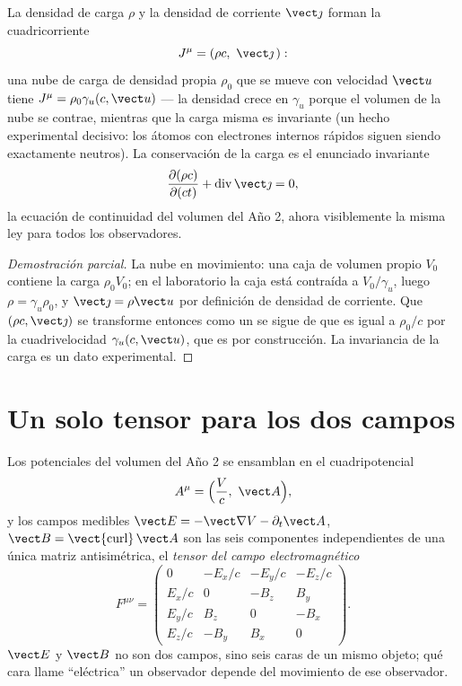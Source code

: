 \begin{proposition}\label{prop:b3:covariant-electromagnetism:fourcurrent}
La densidad de carga $\rho$ y la densidad de corriente $\vect\jmath$ forman
la cuadricorriente
\[
J^\mu = (\rho c,\ \vect\jmath\,) :
\]
una nube de carga de densidad propia $\rho_0$ que se mueve con velocidad
$\vect u$ tiene $J^\mu = \rho_0\gamma_u(c, \vect u)$ --- la densidad crece
en $\gamma_u$ porque el volumen de la nube se contrae, mientras que la carga
misma es invariante (un hecho experimental decisivo: los átomos con
electrones internos rápidos siguen siendo exactamente neutros). La
conservación de la carga es el enunciado invariante
\[
\frac{\partial(\rho c)}{\partial(ct)} +
\operatorname{div}\vect\jmath = 0 ,
\]
la ecuación de continuidad del volumen del Año 2, ahora visiblemente la
misma ley para todos los observadores.
\end{proposition}

\begin{proof}[Demostración parcial]
La nube en movimiento: una caja de volumen propio $V_0$ contiene la carga $\rho_0
V_0$; en el laboratorio la caja está contraída a $V_0/\gamma_u$, luego $\rho =
\gamma_u\rho_0$, y $\vect\jmath = \rho\vect u$ por definición
de densidad de corriente. Que $(\rho c, \vect\jmath)$ se transforme entonces
como un  se sigue de que es igual a $\rho_0/c$ por la
cuadrivelocidad $\gamma_u(c, \vect u)$, que es  por
construcción. La invariancia de la carga es un dato experimental.
\end{proof}

\section{Un solo tensor para los dos campos}

\begin{definition}\label{def:b3:covariant-electromagnetism:tensor}
Los potenciales del volumen del Año 2 se ensamblan en el cuadripotencial
\[
A^\mu = \Big(\frac{V}{c},\ \vect A\Big) ,
\]
y los campos medibles $\vect E = -\vect\nabla V -
\partial_t\vect A$, $\vect B = \operatorname{\vect{curl}}\vect A$ son las
seis componentes independientes de una única matriz antisimétrica, el
\emph{tensor del campo electromagnético}
\[
F^{\mu\nu} =
\begin{pmatrix}
0 & -E_x/c & -E_y/c & -E_z/c\\
E_x/c & 0 & -B_z & B_y\\
E_y/c & B_z & 0 & -B_x\\
E_z/c & -B_y & B_x & 0
\end{pmatrix} .
\]
$\vect E$ y $\vect B$ no son dos campos, sino seis caras de un mismo
objeto; qué cara llame ``eléctrica'' un observador depende del movimiento de
ese observador.
\end{definition}

